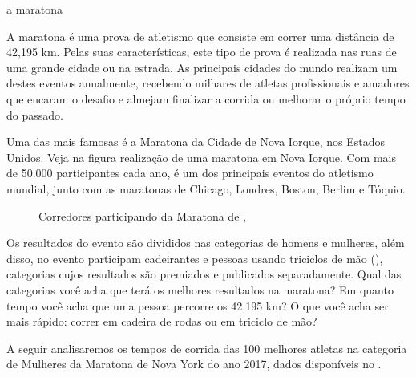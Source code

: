 \label{\detokenize{PE104-0:ativ-maratona-de-ny}}
\begin{task}{ a maratona}

A maratona é uma prova de atletismo que consiste em correr uma distância de 42,195 km. Pelas suas características, este tipo de prova é realizada nas ruas de uma grande cidade ou na estrada. As principais cidades do mundo realizam um destes eventos anualmente, recebendo milhares de atletas profissionais e amadores que encaram o desafio e almejam finalizar a corrida ou melhorar o próprio tempo do passado.

Uma das mais famosas é a Maratona da Cidade de Nova Iorque, nos Estados Unidos. Veja na figura {\hyperref[\detokenize{PE104-0:fig-maratona-ny}]{}} realização de uma maratona em Nova Iorque. Com mais de 50.000 participantes cada ano, é um dos principais eventos do atletismo mundial, junto com as maratonas de Chicago, Londres, Boston, Berlim e Tóquio.

\begin{figure}[H]
\centering
\capstart

\noindent{}
\caption{Corredores participando da Maratona de , }\label{\detokenize{PE104-0:fig-maratona-ny}}\label{\detokenize{PE104-0:id11}}\end{figure}

Os resultados do evento são divididos nas categorias de homens e mulheres, além disso, no evento participam cadeirantes e pessoas usando triciclos de mão (), categorias cujos resultados são premiados e publicados separadamente. Qual das categorias você acha que terá os melhores resultados na maratona? Em quanto tempo você acha que uma pessoa percorre os 42,195 km? O que você acha ser mais rápido: correr em cadeira de rodas ou em triciclo de mão?
\label{\detokenize{PE104-0:handcycle}}
\begin{figure}[H]
\centering

\noindent{}
\label{\detokenize{PE104-0:handcycle}}\end{figure}

A seguir analisaremos os tempos de corrida das 100 melhores atletas na categoria de Mulheres da Maratona de Nova York do ano 2017, dados disponíveis no .


\end{task}
